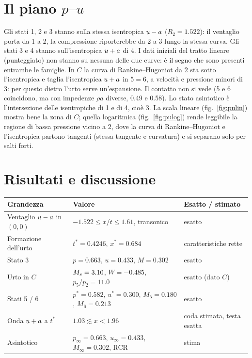 \section*{Il piano $p$--$u$}

Gli stati 1, 2 e 3 stanno sulla stessa isentropica $u-a$ ($R_2=\num{1.522}$): il ventaglio porta da 1 a 2, la
compressione riporterebbe da 2 a 3 lungo la stessa curva. Gli stati 3 e 4 stanno sull'isentropica $u+a$ di 4. I
dati iniziali del tratto lineare (punteggiato) non stanno su nessuna delle due curve: è il segno che sono presenti
entrambe le famiglie. In $C$ la curva di Rankine--Hugoniot da 2 sta sotto l'isentropica e taglia l'isentropica
$u+a$ in $5=6$, a velocità e pressione minori di 3: per questo dietro l'urto serve un'espansione. Il contatto non
si vede (5 e 6 coincidono, ma con impedenze $\rho a$ diverse, \num{0.49} e \num{0.58}). Lo stato asintotico è
l'intersezione delle isentropiche di 1 e di 4, cioè 3. La scala lineare (fig.~\ref{fig:pulin}) mostra bene la zona
di $C$; quella logaritmica (fig.~\ref{fig:pulog}) rende leggibile la regione di bassa pressione vicino a 2, dove la
curva di Rankine--Hugoniot e l'isentropica partono tangenti (stessa tangente e curvatura) e si separano solo per
salti forti.

\section*{Risultati e discussione}
\begin{table}[H]
  \centering
  \small
  \begin{tabular}{lp{6.4cm}p{3.2cm}}
    \toprule
    Grandezza & Valore & Esatto / stimato \\
    \midrule
    Ventaglio $u-a$ in $(0,0)$ & $-\num{1.522}\le x/t\le\num{1.61}$, transonico & esatto \\
    Formazione dell'urto & $t^*=\num{0.4246}$, $x^*=\num{0.684}$ & caratteristiche rette \\
    Stato 3 & $p=\num{0.663}$, $u=\num{0.433}$, $M=\num{0.302}$ & esatto \\
    Urto in $C$ & $M_{s}=\num{3.10}$, $W=-\num{0.485}$, $p_5/p_2=\num{11.0}$ & esatto (dato $C$) \\
    Stati 5 / 6 & $p^*=\num{0.582}$, $u^*=\num{0.300}$, $M_5=\num{0.180}$, $M_6=\num{0.213}$ & esatto \\
    Onda $u+a$ a $t^*$ & $\num{1.03}\lesssim x<\num{1.96}$ & coda stimata, testa esatta \\
    Asintotico & $p_\infty=\num{0.663}$, $u_\infty=\num{0.433}$, $M_\infty=\num{0.302}$, RCR & stima \\
    \bottomrule
  \end{tabular}
\end{table}

